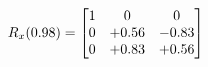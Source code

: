 \documentclass[preview]{standalone}
\begin{document}
\begin{align*}
\special{dvisvgm:raw <g id='unique000'>}R_{x}(0.98) = \begin{bmatrix}1 & 0 & 0 \\0 & +0.56 & -0.83 \\0 & +0.83 & +0.56\end{bmatrix}\special{dvisvgm:raw </g>}
\end{align*}
\end{document}
